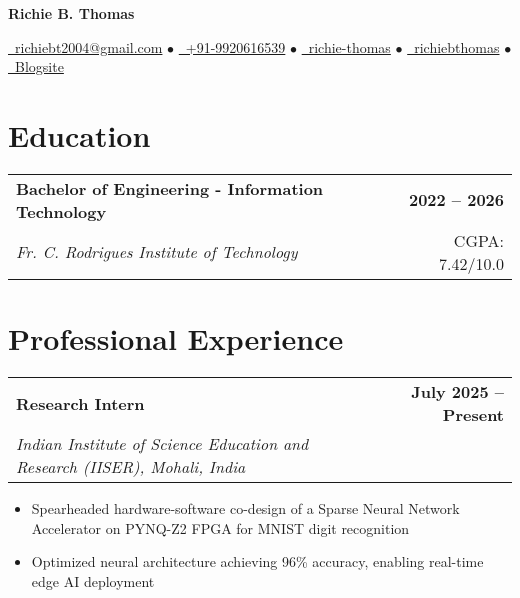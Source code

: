 \documentclass[10pt,a4paper]{article}
\makeatletter
\newcommand{\resumeItem}[1]{\item\small{#1}}
\newcommand{\resumeSubheading}[4]{
  \vspace{-1pt}
  \begin{tabular*}{\textwidth}[t]{l@{\extracolsep{\fill}}r}
    \textbf{#1} & \textcolor{light}{\small\textbf{#2}} \\
    \textit{\small#3} & \textcolor{light}{\small#4} \\
  \end{tabular*}\vspace{-5pt}
}
\makeatother
\begin{document}
\begin{center}
    {\LARGE\bfseries\color{primary} Richie B. Thomas}
    
    \vspace{0.3em}
    
    \href{mailto:richiebt2004@gmail.com}{\faEnvelope\ richiebt2004@gmail.com} $\bullet$
    \href{tel:+919920616539}{\faMobile\ +91-9920616539} $\bullet$
    \href{https://www.linkedin.com/in/richie-thomas/}{\faLinkedin\ richie-thomas} $\bullet$
    \href{https://github.com/richiebthomas}{\faGithub\ richiebthomas} $\bullet$
    \href{https://richiebthomas.github.io/blog}{\faGlobe\ Blogsite}
\end{center}

\vspace{0.2em}

\section{Education}

\resumeSubheading
{Bachelor of Engineering - Information Technology}{2022 -- 2026}
{Fr. C. Rodrigues Institute of Technology}{CGPA: 7.42/10.0}

\vspace{0.1em}

\section{Professional Experience}

\resumeSubheading
{Research Intern}{July 2025 -- Present}
{Indian Institute of Science Education and Research (IISER), Mohali, India}{}
\begin{itemize}
    \resumeItem{Spearheaded hardware-software co-design of a Sparse Neural Network Accelerator on PYNQ-Z2 FPGA for MNIST digit recognition}
    \resumeItem{Optimized neural architecture achieving 96\% accuracy, enabling real-time edge AI deployment}
\end{itemize}
\end{document}
